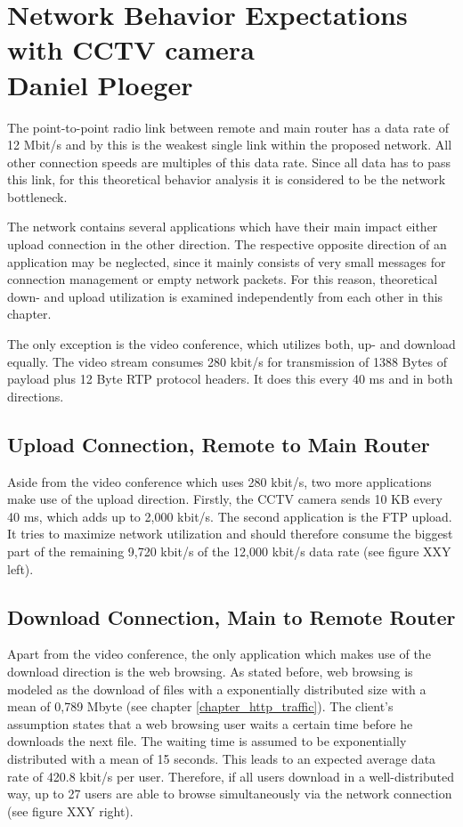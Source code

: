 \documentclass[a4paper,10pt]{book}\usepackage{graphicx}
\begin{document}
\section{Network Behavior  Expectations with CCTV camera\\ {\large Daniel Ploeger}}

The point-to-point radio link between remote and main router has a data rate 
of 12 Mbit/s and by this is the weakest single link within the proposed network. 
All other connection speeds are multiples of this data rate. Since all data has 
to pass this link, for this theoretical behavior analysis it is considered to 
be the network bottleneck.

The network contains several applications which have their main impact either
upload connection in the other direction. The respective opposite direction of an
 application may be neglected, since it mainly consists of very small messages for connection management or empty network packets. For 
 this reason, theoretical down- and upload utilization is examined independently from each other in this chapter. 

The only exception is the video conference, which utilizes both, up- and download 
equally. The video stream consumes 280 kbit/s for transmission of 1388 Bytes of 
payload plus 12 Byte RTP protocol headers. It does this every 40 ms and in both 
directions.

\subsection{Upload Connection, Remote to Main Router}
Aside from the video conference which uses 280 kbit/s, two more applications make use of the upload direction. Firstly, the CCTV camera sends 10 KB every 40 ms, which adds up to 2,000 kbit/s. The second application is the FTP upload. It tries to maximize network utilization and should therefore consume the biggest part of the remaining 9,720 kbit/s of the 12,000 kbit/s data rate (see figure XXY left).

\subsection{Download Connection, Main to Remote Router}
Apart from the video conference, the only application which makes use of the download direction is the web browsing. As stated before, web browsing is modeled as the download of files with a exponentially distributed size with a mean of 0,789 Mbyte (see chapter \ref{chapter_http_traffic}). The client's assumption states that a web browsing user waits a certain time before he downloads the next file. The waiting time is assumed to be exponentially distributed with a mean of 15 seconds. This leads to an expected average data rate of 420.8 kbit/s per user. Therefore, if all users download in a well-distributed way, up to 27 users are able to browse simultaneously via the network connection (see figure XXY right).
\end{document}
